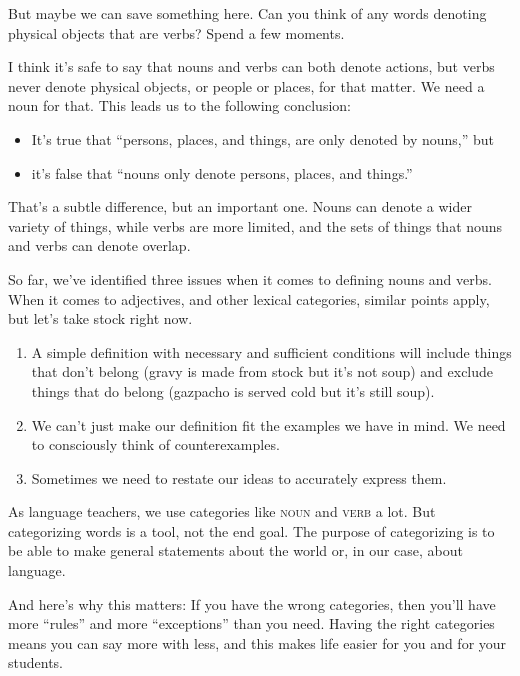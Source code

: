 But maybe we can save something here. Can you think of any words denoting physical objects that are verbs? Spend a few moments.

\bigskip

I think it's safe to say that nouns and verbs can both denote actions, but verbs never denote physical objects, or people or places, for that matter. We need a noun for that. This leads us to the following conclusion:
\begin{itemize}[noitemsep]
    \item It's true that ``persons, places, and things, are only denoted by nouns,'' but
    \item it's false that ``nouns only denote persons, places, and things.''
\end{itemize}
That's a subtle difference, but an important one. Nouns can denote a wider variety of things, while verbs are more limited, and the sets of things that nouns and verbs can denote overlap.

So far, we've identified three issues when it comes to defining nouns and verbs. When it comes to adjectives, and other lexical categories, similar points apply, but let's take stock right now.
\begin{enumerate}[noitemsep]
    \item A simple definition with necessary and sufficient conditions will include things that don't belong (gravy is made from stock but it's not soup) and exclude things that do belong (gazpacho is served cold but it's still soup).
    \item We can't just make our definition fit the examples we have in mind. We need to consciously think of counterexamples.
    \item Sometimes we need to restate our ideas to accurately express them.
\end{enumerate}

As language teachers, we use categories like \textsc{noun} and \textsc{verb} a lot. But categorizing words is a tool, not the end goal. The purpose of categorizing is to be able to make general statements about the world or, in our case, about language.

And here's why this matters: If you have the wrong categories, then you'll have more ``rules'' and more ``exceptions'' than you need. Having the right categories means you can say more with less, and this makes life easier for you and for your students.

